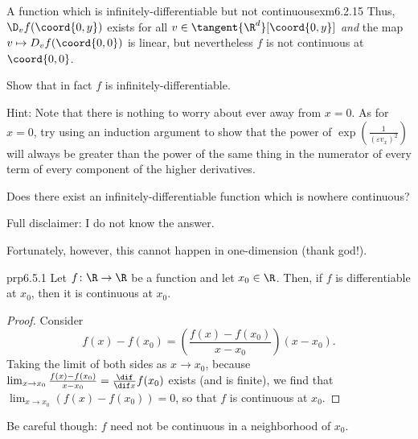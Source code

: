 \begin{exm}{A function which is infinitely-diff\-er\-en\-tia\-ble but not continuous}{exm6.2.15}
Thus, $\D _vf(\coord{0,y})$ exists for all $v\in \tangent{\R ^d}[\coord{0,y}]$ \emph{and} the map $v\mapsto D _vf(\coord{0,0})$ is linear, but nevertheless $f$ is not continuous at $\coord{0,0}$.

\begin{exr}[breakable=false]{}{}
Show that in fact $f$ is infinitely-differentiable.
\begin{rmk}
Hint:  Note that there is nothing to worry about ever away from $x=0$.  As for $x=0$, try using an induction argument to show that the power of $\exp \left( \tfrac{1}{(\varepsilon v_x)^2}\right)$ will always be greater than the power of the same thing in the numerator of every term of every component of the higher derivatives.
\end{rmk}
\end{exr}
\end{exm}
\begin{exr}{}{}
Does there exist an infinitely-differentiable function which is nowhere continuous?
\begin{rmk}
Full disclaimer:  I do not know the answer.
\end{rmk}
\end{exr}
Fortunately, however, this cannot happen in one-dimension (thank god!).
\begin{prp}{}{prp6.5.1}
Let $f\colon \R \rightarrow \R$ be a function and let $x_0\in \R$.  Then, if $f$ is differentiable at $x_0$, then it is continuous at $x_0$.
\begin{proof}
Consider
\begin{equation}
f(x)-f(x_0)=\left( \frac{f(x)-f(x_0)}{x-x_0}\right) (x-x_0).
\end{equation}
Taking the limit of both sides as $x\to x_0$, because $\lim _{x\to x_0}\frac{f(x)-f(x_0)}{x-x_0}=\frac{\dif}{\dif x}f(x_0)$ exists (and is finite), we find that $\lim _{x\to x_0}(f(x)-f(x_0))=0$, so that $f$ is continuous at $x_0$.
\end{proof}
\end{prp}
Be careful though:  $f$ need not be continuous in a neighborhood of $x_0$.
